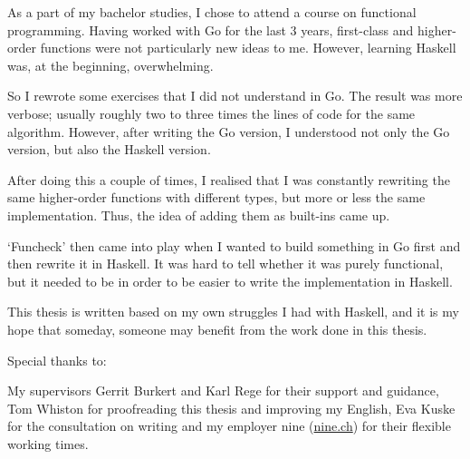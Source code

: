 
As a part of my bachelor studies, I chose to attend a course on functional programming.
Having worked with Go for the last 3 years, first-class and higher-order functions
were not particularly new ideas to me. However, learning Haskell was, at the beginning,
overwhelming.

So I rewrote some exercises that I did not understand in Go.
The result was more verbose; usually
roughly two to three times the lines of code for the same algorithm.
However, after writing the Go version, I understood not only the Go version,
but also the Haskell version.

After doing this a couple of times, I realised that I was constantly rewriting
the same higher-order functions with different types, but more or less the same
implementation. Thus, the idea of adding them as built-ins came up.

`Funcheck' then came into play when I wanted to build something in Go first and
then rewrite it in Haskell. It was hard to tell whether it was purely functional,
but it needed to be in order to be easier to write the implementation in Haskell.

This thesis is written based on my own struggles I had with Haskell, and it is
my hope that someday, someone may benefit from the work done in this thesis.

Special thanks to:

My supervisors Gerrit Burkert and Karl Rege for their support and guidance,
Tom Whiston for proofreading this thesis and improving my English,
Eva Kuske for the consultation on writing and
my employer nine (\href{http://nine.ch}{nine.ch}) for their flexible working times.
